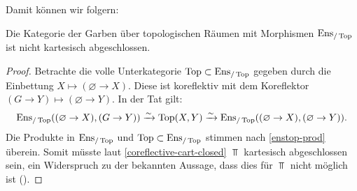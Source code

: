 Damit können wir folgern:
\begin{prop} \label{full-enstop-not-cart-closed}
  Die Kategorie der Garben über topologischen Räumen mit Morphismen
  $\operatorname{Ens}_{/\operatorname{Top}}$ ist nicht kartesisch abgeschlossen.
\end{prop}
\begin{proof}
  Betrachte die volle Unterkategorie $\operatorname{Top} \subset \operatorname{Ens}_{/\operatorname{Top}}$ gegeben
  durch die Einbettung $X \mapsto (\varnothing \to X)$. Diese ist
  koreflektiv mit dem Koreflektor $(G \to Y) \mapsto (\varnothing \to
  Y)$. In der Tat gilt:
  \[ \operatorname{Ens}_{/\operatorname{Top}}((\varnothing \to X), (G \to Y)) \xrightarrow[]{\sim} \operatorname{Top}(X, Y)
  \xrightarrow[]{\sim} \operatorname{Ens}_{/\operatorname{Top}}((\varnothing \to X), (\varnothing \to Y)).
  \]
  Die Produkte in $\operatorname{Ens}_{/\operatorname{Top}}$ und $\operatorname{Top} \subset \operatorname{Ens}_{/\operatorname{Top}}$ stimmen nach
  \ref{enstop-prod} überein. Somit müsste laut
  \ref{coreflective-cart-closed} $\Top$ kartesisch abgeschlossen sein,
  ein Widerspruch zu der bekannten Aussage, dass dies für $\Top$ nicht
  möglich ist (\cite{??}).
\end{proof}

